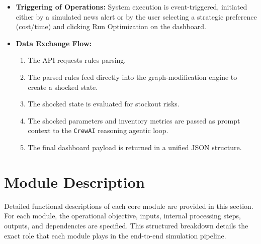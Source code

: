 \begin{itemize}
    \item \textbf{Triggering of Operations:} System execution is event-triggered, initiated either by a simulated news alert or by the user selecting a strategic preference (cost/time) and clicking Run Optimization on the dashboard.
    \item \textbf{Data Exchange Flow:}
    \begin{enumerate}[label=(\roman*)]
        \item The API requests rules parsing.
        \item The parsed rules feed directly into the graph-modification engine to create a shocked state.
        \item The shocked state is evaluated for stockout risks.
        \item The shocked parameters and inventory metrics are passed as prompt context to the \texttt{CrewAI} reasoning agentic loop.
        \item The final dashboard payload is returned in a unified JSON structure.
    \end{enumerate}
\end{itemize}

\section[Module Description]{Module Description}
Detailed functional descriptions of each core module are provided in this section. For each module, the operational objective, inputs, internal processing steps, outputs, and dependencies are specified. This structured breakdown details the exact role that each module plays in the end-to-end simulation pipeline.

